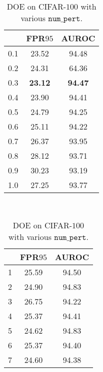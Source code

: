 \documentclass{article} \usepackage{iclr2022_conference,times}
\begin{document}
\begin{table}[t]
{\vspace{5pt}
{
\begin{tabular}{c|cc}
\toprule[1.5pt]
                  & FPR$95$                & AUROC                  \\
\midrule[0.6pt]
0.1               & 23.52                  & 94.48                  \\
0.2               & 24.31                  & 64.36                  \\
\cellcolor{greyL}0.3               & \cellcolor{greyL}\textbf{23.12}                  & \cellcolor{greyL}\textbf{94.47}                  \\
0.4               & 23.90                  & 94.41                  \\
0.5               & 24.79                  & 94.25                  \\
0.6               & 25.11                  & 94.22                  \\
0.7               & 26.37                  & 93.95                  \\
0.8               & 28.12                  & 93.71                  \\
0.9               & 30.23                  & 93.19                  \\
1.0               & 27.25                  & 93.77                  \\
\bottomrule[1.5pt]      
\end{tabular}
}}~~
\parbox{.23\linewidth}{
\centering
\scriptsize
\caption{DOE on CIFAR-$100$ with various $\texttt{num\_pert}$.} \label{tab: hyper_pert}
\vspace{5pt}
{
\begin{tabular}{c|cc}
\toprule[1.5pt]
                   & FPR$95$                & AUROC               \\
\midrule[0.6pt]
1               & 25.59                  & 94.50                  \\
2               & 24.90                  & 94.83                  \\
3               & 26.75                  & 94.22                  \\
4               & 25.37                  & 94.41                  \\
5               & 24.62                  & 94.83                  \\
6               & 25.37                  & 94.40                  \\
7               & 24.60                  & 94.38                  \\

\end{tabular}}}
\end{table}
\end{document}
